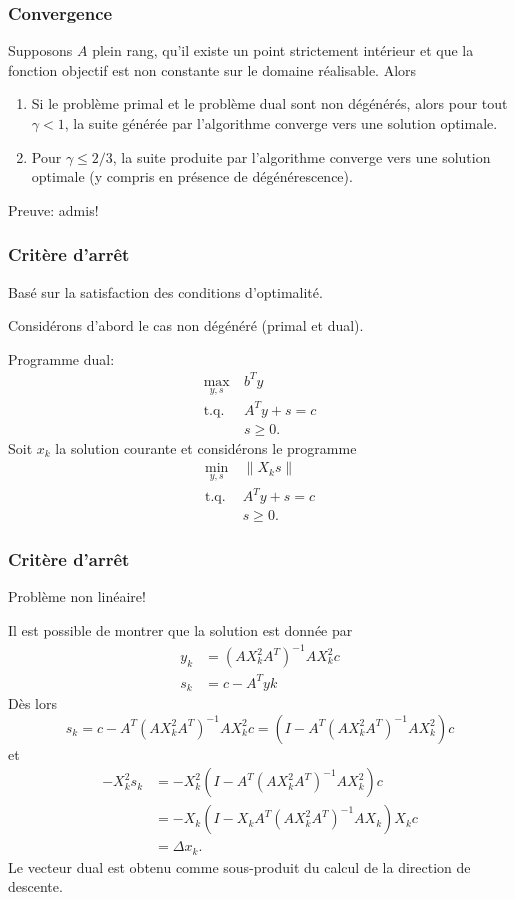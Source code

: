 \documentclass[t,usepdftitle=false]{beamer}
\begin{document}
\begin{frame}
	\frametitle{Convergence}
	
	Supposons $A$ plein rang, qu'il existe un point strictement intérieur et que la fonction objectif est non constante sur le domaine réalisable.
	Alors
	\begin{enumerate}
		\item
		Si le problème primal et le problème dual sont non dégénérés, alors pour tout $\gamma < 1$, la suite générée par l'algorithme converge vers une solution optimale.
		\item
		Pour $\gamma \leq 2/3$, la suite produite par l’algorithme converge
		vers une solution optimale (y compris en présence de dégénérescence).
	\end{enumerate}
	
	Preuve: admis!
	
\end{frame}

\begin{frame}
	\frametitle{Critère d’arrêt}
	
	Basé sur la satisfaction des conditions d'optimalité.
	
	\mbox{}
	
	Considérons d’abord le cas non dégénéré (primal et dual).
	
	\mbox{}
	
	Programme dual:
	\begin{align*}
		\max_{y,s} \ & b^Ty \\
		\mbox{t.q. } & A^Ty + s = c \\
		& s \geq 0.
	\end{align*}
	Soit $x_k$ la solution courante et considérons le programme
	\begin{align*}
		\min_{y,s} \ & \| X_ks \| \\
		\mbox{t.q. } & A^Ty + s = c \\
		& s \geq 0.
	\end{align*}
	
\end{frame}

\begin{frame}
	\frametitle{Critère d’arrêt}
	
	Problème non linéaire!
		
	\mbox{}
	
	Il est possible de montrer que la solution est donnée par
	\begin{align*}
		y_k &= (AX^2_kA^T)^{-1}AX^2_kc \\
		s_k &= c - A^Tyk
	\end{align*}
	Dès lors
	$$
	s_k = c - A^T(AX^2_kA^T)^{-1}AX^2_kc = (I - A^T(AX^2_kA^T)^{-1}AX^2_k)c
	$$
	et
	\begin{align*}
		-X^2_ks_k &= -X^2_k(I - A^T(AX^2_kA^T)^{-1}AX^2_k)c \\
		&= -X_k(I - X_kA^T(AX^2_kA^T)^{-1}AX_k)X_kc \\
		&= \Delta x_k.
	\end{align*}
	Le vecteur dual est obtenu comme sous-produit du calcul
	de la direction de descente.
	
\end{frame}
\end{document}
